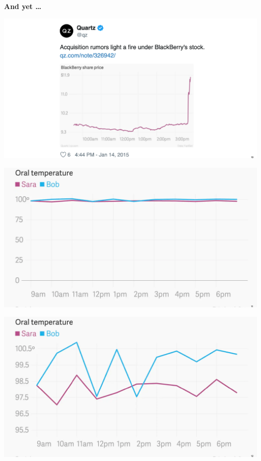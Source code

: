 \documentclass[
  ignorenonframetext,
]{beamer}
\begin{document}
\begin{frame}{}
\protect\hypertarget{section-4}{}
\centering

\huge \textbf{And yet \ldots{}}
\end{frame}

\begin{frame}{}
\protect\hypertarget{section-5}{}
\includegraphics{hallofshame_figs/fig_10.png}
\end{frame}

\begin{frame}{}
\protect\hypertarget{section-6}{}
\includegraphics{hallofshame_figs/fig_11.png}
\end{frame}

\begin{frame}{}
\protect\hypertarget{section-7}{}
\includegraphics{hallofshame_figs/fig_12.png}
\end{frame}
\end{document}
